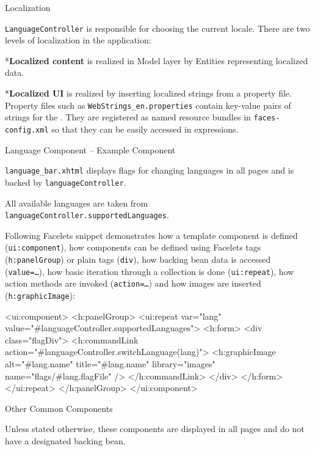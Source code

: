 \secc Localization

{\tt LanguageController} is responsible for choosing the current locale. There are two levels of localization in the application:

\begitems

*{\bf Localized content} is realized in Model layer by Entities representing localized data.

*{\bf Localized UI} is realized by inserting localized strings from a property file. Property files such as {\tt WebStrings\_en.properties} contain key-value pairs of strings for the . They are registered as named resource bundles in {\tt faces-config.xml} so that they can be easily accessed in  expressions.

\enditems


\secc Language Component -- Example Component

{\tt language\_bar.xhtml} displays flags for changing languages in all pages and is backed by {\tt languageController}. 

All available languages are taken from {\tt languageController.supportedLanguages}.

Following Facelets snippet demonstrates how a template component is defined ({\tt ui:component}), how  components can be defined using Facelets tags ({\tt h:panelGroup}) or plain  tags ({\tt div}), how backing bean data is accessed ({\tt value=…}), how basic iteration through a collection is done ({\tt ui:repeat}), how action methods are invoked ({\tt action=…}) and how images are inserted ({\tt h:graphicImage}):

\begtt

<ui:component>
  <h:panelGroup>
    <ui:repeat var="lang"
        value="#{languageController.supportedLanguages}">                    
      <h:form>
        <div class="flagDiv">
          <h:commandLink
              action="#{languageController.switchLanguage(lang)}">
            <h:graphicImage
                alt="#{lang.name}" title="#{lang.name}"
                library="images" name="flags/#{lang.flagFile}" />
          </h:commandLink>
        </div>
      </h:form>
    </ui:repeat>
  </h:panelGroup>
</ui:component>

\endtt

\secc Other Common Components

Unless stated otherwise, these components are displayed in all pages and do not have a designated backing bean.

\begitems

